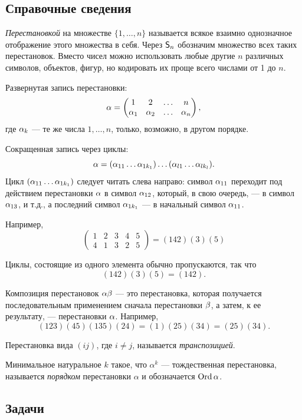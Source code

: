 
\subsection*{Справочные сведения}

\textit{Перестановкой} на множестве $\{1,\dots,n\}$ называется всякое взаимно однозначное отображение этого множества в себя. Через ${\mathsf{S}}_n$ обозначим множество всех таких перестановок. Вместо чисел можно использовать любые другие $n$ различных символов, объектов, фигур, но кодировать их проще всего числами от 1 до $n$.

Развернутая запись перестановки:
$$
\alpha=\begin{pmatrix} 1 & 2& \dots & n \\
\alpha_1 & \alpha_2 & \dots & \alpha_n
\end{pmatrix},
$$
где $\alpha_k$ --- те же числа $1,\dots, n$, только, возможно, в другом порядке.

Сокращенная запись через циклы:
$$
\alpha=(\alpha_{11}\dots \alpha_{1k_1})\dots(\alpha_{l1}\dots \alpha_{lk_l}).
$$
Цикл $(\alpha_{11}\dots \alpha_{1k_1})$ следует читать слева направо: символ $\alpha_{11}$ переходит под действием перестановки $\alpha$ в символ $\alpha_{12}$, который, в свою очередь, --- в символ $\alpha_{13}$, и т.д., а последний символ $\alpha_{1k_1}$ --- в начальный символ $\alpha_{11}$.

Например,
$$
\begin{pmatrix}
1 & 2 & 3 & 4 & 5 \\
4 & 1 & 3 & 2 & 5\end{pmatrix} = (142)(3)(5)
$$

Циклы, состоящие из одного элемента обычно пропускаются, так что
$$
(142)(3)(5) = (142).
$$

Композиция перестановок $\alpha\beta$ --- это перестановка, которая получается последовательным применением сначала перестановки $\beta$, а затем, к ее результату, --- перестановки $\alpha$. Например,
$$
(123)(45) (135)(24) = (1)(25)(34) = (25)(34).
$$

Перестановка вида $(ij)$, где $i\ne j$, называется \textit{транспозицией}.

Минимальное натуральное $k$ такое, что $\alpha^k$ --- тождественная перестановка, называется {\it порядком} перестановки $\alpha$ и обозначается $\mathop{\mathrm{Ord}}\alpha$.

\subsection*{Задачи}


